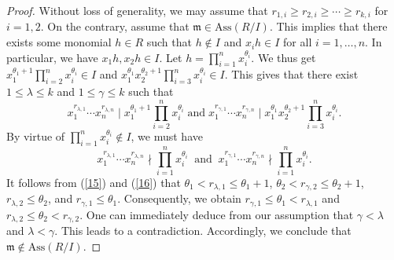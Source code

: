\documentclass[10pt,a4paper]{amsart}
\begin{document}
\begin{proof} 
Without loss of generality, we may assume that   $r_{1,i} \geq r_{2,i} \geq \cdots \geq r_{k, i}$ for $i=1,2$. 
On the contrary, assume that $\mathfrak{m}\in \mathrm{Ass}(R/I)$. This implies that there exists some monomial $h\in R$ such that  $h\notin I$ and 
  $x_ih\in I$ for all $i=1, \ldots, n$. In particular, we have $x_1h, x_2h \in I$.   Let $h=\prod_{i=1}^n x_i^{\theta_i}$. We thus get 
 $x_1^{\theta_1 +1} \prod_{i=2}^n x_i^{\theta_i}\in I$ and $x_1^{\theta_1} x_2^{\theta_2+1}\prod_{i=3}^n x_i^{\theta_i} \in I$. 
  This gives  that there exist  $1\leq \lambda \leq k$  and $1\leq \gamma \leq k$  such that 
  \begin{equation} \label{15}
  x^{r_{\lambda,1}}_1\cdots x^{r_{\lambda,n}}_n \mid x_1^{\theta_1 +1} \prod_{i=2}^n x_i^{\theta_i} \;  \text {and} \;  
  x^{r_{\gamma,1}}_1\cdots x^{r_{\gamma,n}}_n \mid x_1^{\theta_1} x_2^{\theta_2+1}\prod_{i=3}^n x_i^{\theta_i}.
  \end{equation}
       By virtue  of    $\prod_{i=1}^n x_i^{\theta_i}\notin I$,   we must have
      \begin{equation} \label{16}
      x^{r_{\lambda,1}}_1\cdots x^{r_{\lambda,n}}_n \nmid  \prod_{i=1}^n x_i^{\theta_i} \;\; \text{and} \;\;  
     x^{r_{\gamma,1}}_1\cdots x^{r_{\gamma,n}}_n \nmid  \prod_{i=1}^n x_i^{\theta_i}.
      \end{equation}
     It follows from (\ref{15}) and (\ref{16})  that  $\theta_1 < r_{\lambda,1} \leq \theta_1+1$, $\theta_2 < r_{\gamma,2} \leq \theta_2+1$, 
   $r_{\lambda, 2} \leq \theta_2$, and $r_{\gamma, 1} \leq \theta_1$. Consequently, we  obtain $r_{\gamma, 1} \leq \theta_1 < r_{\lambda,1}$ and 
   $r_{\lambda, 2} \leq \theta_2< r_{\gamma,2}$. One can immediately deduce  from  our assumption  that 
    $\gamma < \lambda$ and $\lambda < \gamma$. This leads to a contradiction. Accordingly, we conclude that   $\mathfrak{m}\notin \mathrm{Ass}(R/I)$.    
\end{proof}
\end{document}
